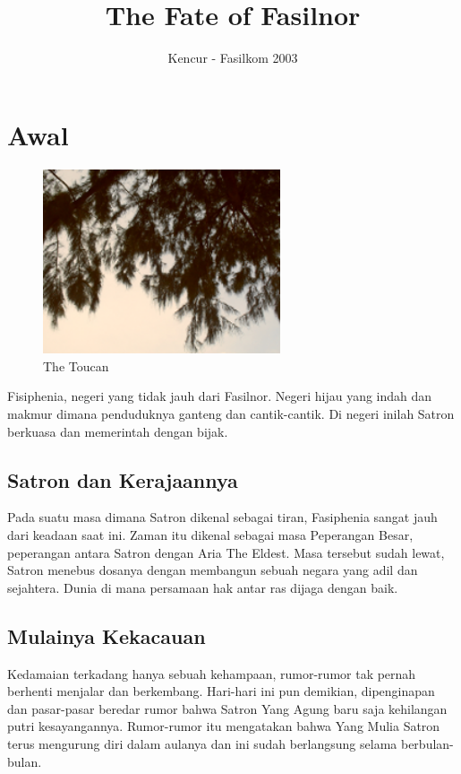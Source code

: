 \documentclass[a4paper,11pt,final]{article}
\title{The Fate of Fasilnor}
\author{Kencur - Fasilkom 2003}
\begin{document}
\maketitle
\tableofcontents
\clearpage

\section{Awal}

\begin{figure}
  \centering
    \includegraphics[width=7cm]{images/pic1}
  \caption{The Toucan}
\end{figure}

Fisiphenia, negeri yang tidak jauh dari Fasilnor. 
Negeri hijau yang indah dan makmur dimana penduduknya ganteng dan 
cantik-cantik. 
Di negeri inilah Satron berkuasa dan memerintah dengan bijak.

\subsection{Satron dan Kerajaannya}
Pada suatu masa dimana Satron dikenal sebagai tiran, Fasiphenia sangat 
jauh dari keadaan saat ini. 
Zaman itu dikenal sebagai masa Peperangan Besar, peperangan antara 
Satron dengan Aria The Eldest. 
Masa tersebut sudah lewat, Satron menebus dosanya dengan membangun 
sebuah negara yang adil dan sejahtera. 
Dunia di mana persamaan hak antar ras dijaga dengan baik. 

\subsection{Mulainya Kekacauan}
Kedamaian terkadang hanya sebuah kehampaan, rumor-rumor tak pernah 
berhenti menjalar dan berkembang. 
Hari-hari ini pun demikian, dipenginapan dan pasar-pasar beredar rumor 
bahwa Satron Yang Agung baru saja kehilangan putri kesayangannya. 
Rumor-rumor itu mengatakan bahwa Yang Mulia Satron terus mengurung 
diri dalam aulanya dan ini sudah berlangsung selama berbulan-bulan.
\end{document}
